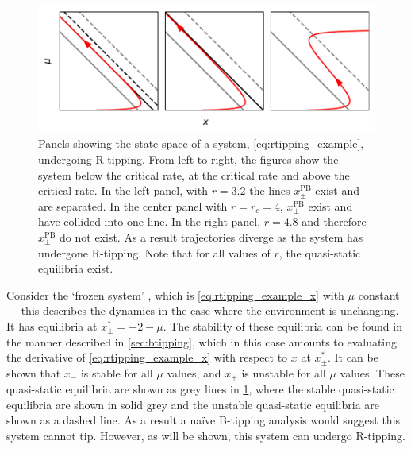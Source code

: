 \begin{figure}
  \centering
  \includegraphics[width=\textwidth,keepaspectratio]{rate}
  \caption[R-tipping mechanism]{Panels showing the state space of a system, \cref{eq:rtipping_example}, undergoing R-tipping.
    From left to right, the figures show the system below the critical rate, at the critical rate and above the critical rate. In the left panel, with $r=3.2$ the lines
    $x^{\mathrm{PB}}_{\pm}$ exist and are separated. In the center panel with $r = r_c = 4$, $x^{\mathrm{PB}}_{\pm}$ exist and have collided into one line. In the right panel,
    $r = 4.8$ and therefore $x^{\mathrm{PB}}_{\pm}$ do not exist. As a result trajectories diverge as the system has undergone R-tipping. Note that for all values of $r$, the
    quasi-static equilibria exist.}
  \label{fig:rate_tipping}
\end{figure}

Consider the `frozen system' \parencite{Wieczorek2021}, which is \cref{eq:rtipping_example_x} with $\mu$ constant --- this describes the dynamics
in the case where the environment is unchanging. It has equilibria at
$x^*_{\pm} = \pm 2 - \mu$. The stability of these equilibria can be found in the manner described in \cref{sec:btipping}, which in this case amounts to evaluating
the derivative of \cref{eq:rtipping_example_x} with respect to $x$ at $x^*_{\pm}$. It can be shown that $x_-$ is stable for all $\mu$ values, and $x_+$ is
unstable for all $\mu$ values. These quasi-static equilibria are shown as grey lines in \cref{fig:rate_tipping}, where the stable quasi-static equilibria are shown in
solid grey and the unstable quasi-static equilibria are shown as a dashed line. As a result a na{\"i}ve B-tipping analysis would suggest this system cannot tip. However, as will be shown,
this system can undergo R-tipping.

